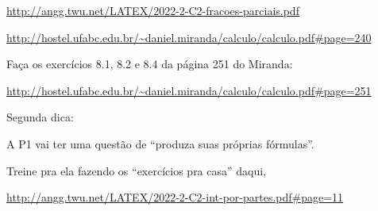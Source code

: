 \documentclass[oneside,12pt]{article}
\begin{document}
\ssk

{\scriptsize

\url{http://angg.twu.net/LATEX/2022-2-C2-fracoes-parciais.pdf}

\url{http://hostel.ufabc.edu.br/~daniel.miranda/calculo/calculo.pdf\#page=240}

}

Faça os exercícios 8.1, 8.2 e 8.4 da página 251 do Miranda:

{\scriptsize

\url{http://hostel.ufabc.edu.br/~daniel.miranda/calculo/calculo.pdf\#page=251}

}


\bsk

Segunda dica:

A P1 vai ter uma questão de ``produza suas próprias fórmulas''.

Treine pra ela fazendo os ``exercícios pra casa'' daqui,

{\scriptsize

\url{http://angg.twu.net/LATEX/2022-2-C2-int-por-partes.pdf#page=11}

}



\ssk










\end{document}
